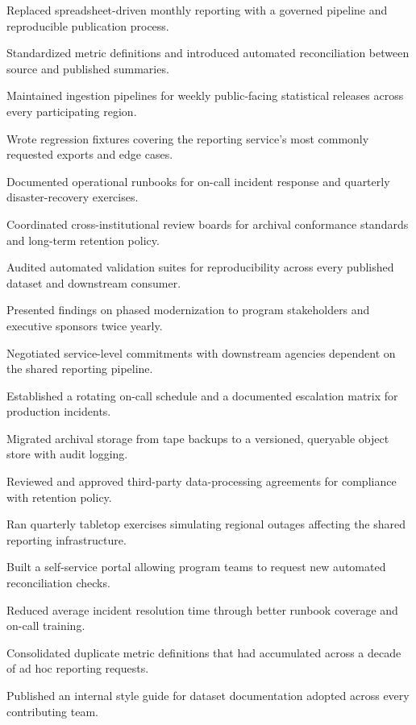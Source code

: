 \documentclass[fontsize=11pt, margin=narrow, medium=print]{careerdossier-resume}
\begin{document}
\begin{CDossierEntry}[title = {Modernization Program}, organization = {Continental Reliability Consortium}, location = {Ottawa, ON}, dates = {2019--Present}]
\begin{CDossierItemize}
    \item Replaced spreadsheet-driven monthly reporting with a governed pipeline and reproducible publication process.
    \item Standardized metric definitions and introduced automated reconciliation between source and published summaries.
    \item Maintained ingestion pipelines for weekly public-facing statistical releases across every participating region.
    \item Wrote regression fixtures covering the reporting service's most commonly requested exports and edge cases.
    \item Documented operational runbooks for on-call incident response and quarterly disaster-recovery exercises.
    \item Coordinated cross-institutional review boards for archival conformance standards and long-term retention policy.
    \item Audited automated validation suites for reproducibility across every published dataset and downstream consumer.
    \item Presented findings on phased modernization to program stakeholders and executive sponsors twice yearly.
    \item Negotiated service-level commitments with downstream agencies dependent on the shared reporting pipeline.
    \item Established a rotating on-call schedule and a documented escalation matrix for production incidents.
    \item Migrated archival storage from tape backups to a versioned, queryable object store with audit logging.
    \item Reviewed and approved third-party data-processing agreements for compliance with retention policy.
    \item Ran quarterly tabletop exercises simulating regional outages affecting the shared reporting infrastructure.
    \item Built a self-service portal allowing program teams to request new automated reconciliation checks.
    \item Reduced average incident resolution time through better runbook coverage and on-call training.
    \item Consolidated duplicate metric definitions that had accumulated across a decade of ad hoc reporting requests.
    \item Published an internal style guide for dataset documentation adopted across every contributing team.

\end{CDossierItemize}
\end{CDossierEntry}
\end{document}
